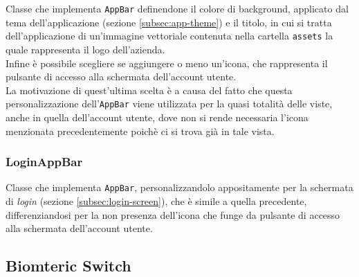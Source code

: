 Classe che implementa \lstinline{AppBar}\cite{site:app-bar} definendone il colore di background, applicato dal tema dell'applicazione (sezione \ref{subsec:app-theme}) e il titolo, in cui si tratta dell'applicazione di un'immagine vettoriale contenuta nella cartella \lstinline{assets} la quale rappresenta il logo dell'azienda.\\
Infine è possibile scegliere se aggiungere o meno un'icona, che rappresenta il pulsante di accesso alla schermata dell'account utente.\\
La motivazione di quest'ultima scelta è a causa del fatto che questa personalizzazione dell'\lstinline{AppBar} viene utilizzata per la quasi totalità delle viste, anche in quella dell'account utente, dove non si rende necessaria l'icona menzionata precedentemente poichè ci si trova già in tale vista.

\subsubsection*{LoginAppBar}
\label{subsubsec:login-app-bar}

Classe che implementa \lstinline{AppBar}, personalizzandolo appositamente per la schermata di \emph{login} (sezione \ref{subsec:login-screen}), che è simile a quella precedente, differenziandosi per la non presenza dell'icona che funge da pulsante di accesso alla schermata dell'account utente.

\subsection{Biomteric Switch}
\label{subsec:biometric-switch}

